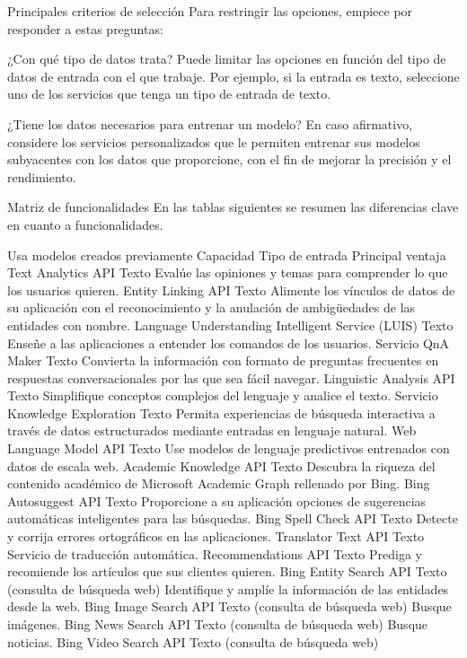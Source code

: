 Principales criterios de selección
Para restringir las opciones, empiece por responder a estas preguntas:

¿Con qué tipo de datos trata? Puede limitar las opciones en función del tipo de datos de entrada con el que trabaje. Por ejemplo, si la entrada es texto, seleccione uno de los servicios que tenga un tipo de entrada de texto.

¿Tiene los datos necesarios para entrenar un modelo? En caso afirmativo, considere los servicios personalizados que le permiten entrenar sus modelos subyacentes con los datos que proporcione, con el fin de mejorar la precisión y el rendimiento.

Matriz de funcionalidades
En las tablas siguientes se resumen las diferencias clave en cuanto a funcionalidades.

Usa modelos creados previamente
Capacidad
Tipo de entrada
Principal ventaja
Text Analytics API
Texto
Evalúe las opiniones y temas para comprender lo que los usuarios quieren.
Entity Linking API
Texto
Alimente los vínculos de datos de su aplicación con el reconocimiento y la anulación de ambigüedades de las entidades con nombre.
Language Understanding Intelligent Service (LUIS)
Texto
Enseñe a las aplicaciones a entender los comandos de los usuarios.
Servicio QnA Maker
Texto
Convierta la información con formato de preguntas frecuentes en respuestas conversacionales por las que sea fácil navegar.
Linguistic Analysis API
Texto
Simplifique conceptos complejos del lenguaje y analice el texto.
Servicio Knowledge Exploration
Texto
Permita experiencias de búsqueda interactiva a través de datos estructurados mediante entradas en lenguaje natural.
Web Language Model API
Texto
Use modelos de lenguaje predictivos entrenados con datos de escala web.
Academic Knowledge API
Texto
Descubra la riqueza del contenido académico de Microsoft Academic Graph rellenado por Bing.
Bing Autosuggest API
Texto
Proporcione a su aplicación opciones de sugerencias automáticas inteligentes para las búsquedas.
Bing Spell Check API
Texto
Detecte y corrija errores ortográficos en las aplicaciones.
Translator Text API
Texto
Servicio de traducción automática.
Recommendations API
Texto
Prediga y recomiende los artículos que sus clientes quieren.
Bing Entity Search API
Texto (consulta de búsqueda web)
Identifique y amplíe la información de las entidades desde la web.
Bing Image Search API
Texto (consulta de búsqueda web)
Busque imágenes.
Bing News Search API
Texto (consulta de búsqueda web)
Busque noticias.
Bing Video Search API
Texto (consulta de búsqueda web)
